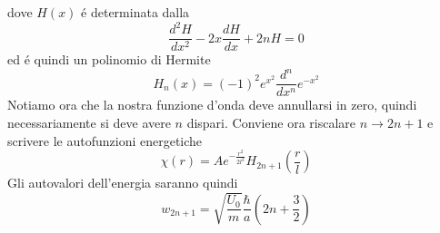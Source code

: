 \documentclass[a4paper]{article}
\begin{document}
        dove $H(x)$ \'e determinata dalla
        \begin{equation*}
            \frac{d^2H}{dx^2}-2x\frac{dH}{dx}+2nH=0
        \end{equation*}
        ed \'e quindi un polinomio di Hermite
        \begin{equation*}
            H_n(x)=(-1)^2e^{x^2}\frac{d^n}{dx^n}e^{-x^2}
        \end{equation*}
        Notiamo ora che la nostra funzione d'onda deve annullarsi in zero, quindi necessariamente si deve avere $n$ dispari.
        Conviene ora riscalare $n\to 2n+1$ e scrivere le autofunzioni energetiche
        \begin{equation*}
            \chi(r)=Ae^{-\frac{r^2}{2l^2}}H_{2n+1}\left(\frac{r}{l}\right)
        \end{equation*}
        Gli autovalori dell'energia saranno quindi
        \begin{equation*}
            w_{2n+1}=\sqrt{\frac{U_0}{m}}\frac{\hbar}{a}\left(2n+\frac{3}{2}\right)
        \end{equation*}
\end{document}
